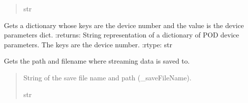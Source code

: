 \documentclass[letterpaper,10pt,english]{sphinxmanual}
\begin{document}
\begin{fulllineitems}
\begin{fulllineitems}
\begin{quote}
\begin{description}
\sphinxAtStartPar
str

\end{description}\end{quote}

\end{fulllineitems}


\begin{fulllineitems}
\label{\detokenize{Setup_PodInterface:Setup_PodInterface.Setup_Interface.GetPODparametersInit}}
\pysigstartsignatures
{}
\pysigstopsignatures
\sphinxAtStartPar
Gets a dictionary whose keys are the device number and the value is the device parameters dict.
:returns: String representation of a dictionary of POD device parameters. The keys are the device number.
:rtype: str

\end{fulllineitems}


\begin{fulllineitems}
\label{\detokenize{Setup_PodInterface:Setup_PodInterface.Setup_Interface.GetSaveFileName}}
\pysigstartsignatures
{}
\pysigstopsignatures
\sphinxAtStartPar
Gets the path and filename where streaming data is saved to.
\begin{quote}\begin{description}
\sphinxAtStartPar
String of the save file name and path (\_saveFileName).

\sphinxAtStartPar
str

\end{description}\end{quote}

\end{fulllineitems}



\end{fulllineitems}
\end{document}
